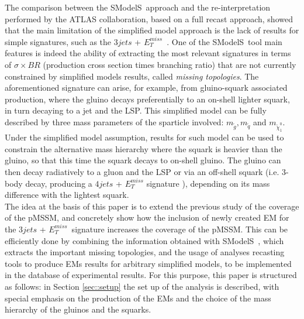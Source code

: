 \documentclass[a4paper,10pt]{article}
\newcommand{\SMO}{{\sc SModelS}}
\newcommand{\MET}{{ $E_T ^{miss}$}}
\begin{document}
The comparison between the \SMO~approach and the re-interpretation performed by the ATLAS collaboration, based on a full recast approach, showed that the main limitation of the simplified model approach is the lack of results for simple signatures, such as the $3jets$ +\MET~. One of the \SMO~tool main features is indeed the ability of extracting the most relevant signatures in terms of $\sigma \times BR$ (production cross section  times branching ratio) that are not currently constrained by simplified models results, called \textit{missing topologies}. The aforementioned signature can arise, for example, from gluino-squark associated production, where the gluino decays preferentially to an on-shell lighter squark, in turn decaying to a jet and the LSP. This simplified model can be fully described by three mass parameters of the sparticle involved: $m_{\tilde g}, m_{\tilde q}$ and $m_{\tilde \chi _1 ^0}$. Under the simplified model assumption, results for such model can be used to constrain the alternative mass hierarchy where the squark is heavier than the gluino, so that this time the squark decays to on-shell gluino. The gluino can then decay radiatively to a gluon and the LSP or via an off-shell squark (i.e. 3-body decay, producing a $4jets$ + $E_T ^{miss}$ signature ), depending on its mass difference with the lightest squark. 
\\

The idea at the basis of this paper is to extend the previous study of the coverage of the pMSSM, and concretely show how the inclusion of newly created EM for the $3jets$ + \MET~signature increases the coverage of the pMSSM. This can be efficiently done by combining the information obtained with \SMO~, which extracts the important missing topologies, and the usage of analyses recasting tools to produce EMs results for arbitrary simplified models, to be implemented in the database of experimental results. For this purpose, this paper is structured as follows: in Section \ref{sec::setup} the set up of the analysis is described, with special emphasis on the production of the EMs and the choice of the mass hierarchy of the gluinos and the squarks.
\end{document}
